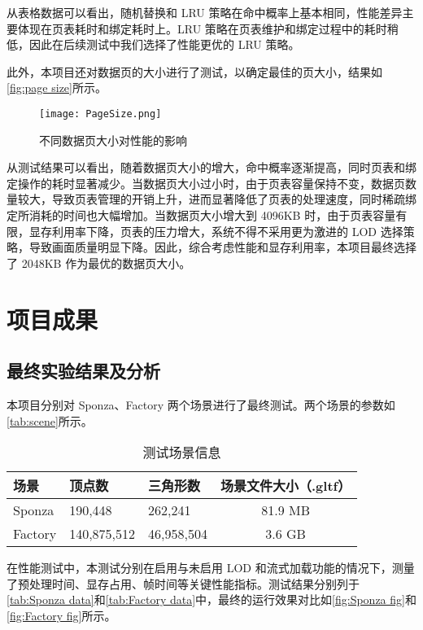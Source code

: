 从表格数据可以看出，随机替换和 LRU 策略在命中概率上基本相同，性能差异主要体现在页表耗时和绑定耗时上。LRU 策略在页表维护和绑定过程中的耗时稍低，因此在后续测试中我们选择了性能更优的 LRU 策略。

此外，本项目还对数据页的大小进行了测试，以确定最佳的页大小，结果如\autoref{fig:page size}所示。

\begin{figure}[ht]
    \centering
    \texttt{[image: PageSize.png]}
    \caption{\label{fig:page size}不同数据页大小对性能的影响}
\end{figure}

从测试结果可以看出，随着数据页大小的增大，命中概率逐渐提高，同时页表和绑定操作的耗时显著减少。当数据页大小过小时，由于页表容量保持不变，数据页数量较大，导致页表管理的开销上升，进而显著降低了页表的处理速度，同时稀疏绑定所消耗的时间也大幅增加。当数据页大小增大到 4096KB 时，由于页表容量有限，显存利用率下降，页表的压力增大，系统不得不采用更为激进的 LOD 选择策略，导致画面质量明显下降。因此，综合考虑性能和显存利用率，本项目最终选择了 2048KB 作为最优的数据页大小。

\section{项目成果}

\subsection{最终实验结果及分析}

本项目分别对 Sponza、Factory 两个场景进行了最终测试。两个场景的参数如\autoref{tab:scene}所示。

\begin{table}[H]
    \caption{\label{tab:scene}测试场景信息}
    \begin{tabularx}{\linewidth}{|X<{\centering}|X<{\centering}|X<{\centering}|c|}
        \hline
        场景 & 顶点数 & 三角形数 & 场景文件大小（.gltf）\\ \hline
        Sponza & 190,448 & 262,241 & 81.9 MB \\ \hline
        Factory & 140,875,512 & 46,958,504 & 3.6 GB \\ \hline
    \end{tabularx}
\end{table}

在性能测试中，本测试分别在启用与未启用 LOD 和流式加载功能的情况下，测量了预处理时间、显存占用、帧时间等关键性能指标。测试结果分别列于\autoref{tab:Sponza data}和\autoref{tab:Factory data}中，最终的运行效果对比如\autoref{fig:Sponza fig}和\autoref{fig:Factory fig}所示。


